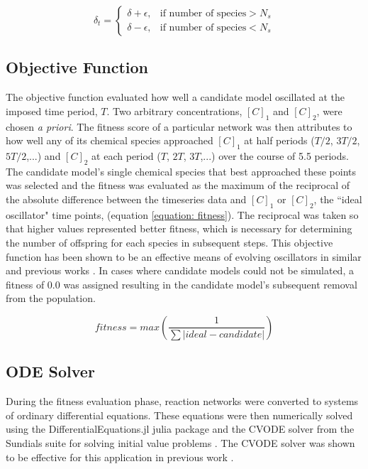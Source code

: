 \documentclass[12pt]{report}
\begin{document}
\begin{equation}
	\delta_{t} = \begin{cases}\delta+\epsilon,& \mbox{if number of species} > N_{s} \\
	\delta-\epsilon,& \mbox{if number of species} < N_{s}
	\end{cases}
\end{equation}

\subsection{Objective Function}

The objective function evaluated how well a candidate model oscillated at the imposed time period, $T$.  Two arbitrary concentrations, $[C]_{1}$ and $[C]_{2}$,  were chosen \textit{a priori}. The fitness score of a particular network was then attributes to how well any of its chemical species approached $[C]_{1}$ at half periods ($T/2$, $3T/2$, $5T/2$,...) and  $[C]_{2}$ at each period ($T$, $2T$, $3T$,...) over the course of 5.5 periods. The candidate model's single chemical species that best approached these points was selected and the fitness was evaluated as the maximum of the reciprocal of the absolute difference between the timeseries data and $[C]_{1}$ or $[C]_{2}$, the ``ideal oscillator" time points, (equation \ref{equation: fitness}). The reciprocal was taken so that higher values represented better fitness, which is necessary for determining the number of offspring for each species in subsequent steps. This objective function has been shown to be an effective means of evolving oscillators in similar and previous works \cite{Paladugu2006, francois_hakim_2004, Tatka2023}. In cases where candidate models could not be simulated, a fitness of 0.0 was assigned resulting in the candidate model's subsequent removal from the population.

\begin{equation}
\label{equation: fitness}
fitness = max(\frac{1}{\sum|ideal - candidate|})
\end{equation}

\subsection{ODE Solver}
During the fitness evaluation phase, reaction networks were converted to systems of ordinary differential equations. These equations were then numerically solved using the DifferentialEquations.jl julia package \cite{DifferentialEquations.jl-2017} and the CVODE solver from the Sundials suite for solving initial value problems \cite{hindmarsh2005sundials}. The CVODE solver was shown to be effective for this application in previous work \cite{Tatka2023}.
\end{document}
